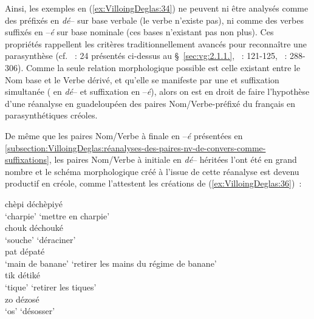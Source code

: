 \documentclass[output=paper]{langsci/langscibook}
\begin{document}
Ainsi, les exemples en (\ref{ex:VilloingDeglas:34}) ne peuvent ni être analysés comme des
préfixés en \emph{dé}-- sur base verbale (le verbe n'existe pas), ni
comme des verbes suffixés en --\emph{é} sur base nominale (ces bases
n'existant pas non plus). Ces propriétés rappellent les critères
traditionnellement avancés pour reconnaître une parasynthèse %
(cf. %
\citealt{darmesteter1894.traite-formation}%
%
~: 24 présentés ci-dessus au §~\ref{sec:vg:2.1.1.}, %
\citealt{Corbin87}%
%
~: 121-125, %
\citealt{Fradin2003}%
%
~: 288-306).
%
Comme la seule relation morphologique
possible est celle existant entre le Nom base et le Verbe dérivé, et
qu'elle se manifeste par une  et suffixation simultanée
( en \emph{dé}-- et suffixation en --\emph{é}), alors on est
en droit de faire l'hypothèse d'une réanalyse en guadeloupéen des paires
Nom/Verbe-préfixé du français en parasynthétiques créoles.

De même que les paires Nom/Verbe à finale en --\emph{é} présentées en
\ref{subsection:VilloingDeglas:réanalyses-des-paires-nv-de-convers-comme-suffixations},
les paires Nom/Verbe à initiale en \emph{dé}-- héritées l'ont été
en grand nombre et le schéma morphologique créé à l'issue de cette
réanalyse est devenu productif en créole, comme l'attestent les
créations de (\ref{ex:VilloingDeglas:36})~:

\ea \label{ex:VilloingDeglas:36}
      \ea \gll chèpi \textrightarrow{~} déchèpiyé\\
        {`charpie'} {} {`mettre en charpie'}\\
      \ex \gll  chouk \textrightarrow{~} déchouké\\
        {`souche'} {} {`déraciner'}\\
      \ex \gll  pat \textrightarrow{~} dépaté\\
        {`main de banane'} {} {`retirer les mains du régime de banane'}\\
      \ex \gll  tik \textrightarrow{~} détiké\\
        {`tique'} {} {`retirer les tiques'}\\
      \ex \gll  zo \textrightarrow{~} dézosé\\
        {`os'} {} {`désosser'}\\
\z\z
\end{document}
